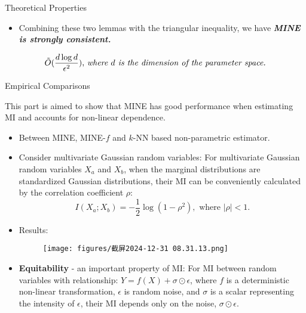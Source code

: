 \documentclass[final]{beamer}
\newlength{\colwidth}
\begin{document}
\begin{frame}[t]
\begin{columns}[t]
\begin{column}{\colwidth}
\begin{block}{Theoretical Properties}
\begin{itemize}
            \item Combining these two lemmas with the triangular inequality,  we have \textit{\textbf{MINE is strongly consistent.}}
        \end{itemize}
            $$\tilde O(\frac{d\log d}{\epsilon^2})\text{, \textit{where $d$ is the dimension of the parameter space.}}$$

\end{block}

\begin{block}{Empirical Comparisons}

    This part is aimed to show that MINE has good performance when estimating MI and accounts for non-linear dependence.

        \begin{itemize}
            \item Between MINE, MINE-$f$ and $k$-NN based non-parametric estimator.

            \item Consider multivariate Gaussian random variables: For multivariate Gaussian random variables $X_a$ and $X_b$, when the marginal distributions are standardized Gaussian distributions, their MI can be conveniently calculated by the correlation coefficient $\rho$:
            \begin{equation}
                 I(X_a; X_b) = -\frac{1}{2} \log(1 - \rho^2), \text{ where } |\rho| < 1.
            \end{equation}
            \item Results:
                \begin{figure}
                    \centering
                    \texttt{[image: figures/截屏2024-12-31 08.31.13.png]}
                \end{figure}
        \end{itemize}
        
        \begin{itemize}
            \item 
            \textbf{Equitability} - an important property of MI: For MI between random variables with relationship: $Y = f(X) + \sigma \odot \epsilon$, where $f$ is a deterministic non-linear transformation, $\epsilon$ is random noise, and $\sigma$ is a scalar representing the intensity of $\epsilon$, their MI depends only on the noise, $\sigma \odot \epsilon$.


\end{itemize}
\end{block}
\end{column}
\end{columns}
\end{frame}
\end{document}
